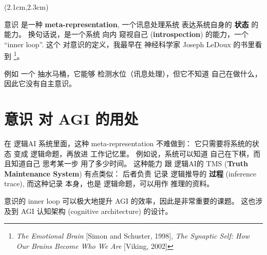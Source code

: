 \begin{preview}

\cc{
\title{\vspace{-1.5cm} \bfseries\color{blue}{\LARGE AGI 的自主意识}}
}{
\title{\vspace{-1.5cm} \bfseries\color{blue}{\LARGE Consciousness in AGI}}
}

\date{\vspace{-2cm}} %

\maketitle

\setcounter{section}{0}

\begin{textblock*}{5cm}(2.1cm,2.3cm) %
{}
\end{textblock*}

\begin{minipage}{\textwidth}
\setlength{\parskip}{0.4\baselineskip}

意识 是一种 \textbf{meta-representation}, 一个讯息处理系统 表达系统自身的 \textbf{状态} 的能力。 换句话说，是一个系统 向内 窥视自己 (\textbf{introspection}) 的能力，一个 ``inner loop''.  这个 对意识的定义，我最早在 神经科学家 Joseph LeDoux 的书里看到 \footnote{\textit{The Emotional Brain} [Simon and Schuster, 1998], \textit{The Synaptic Self: How Our Brains Become Who We Are} [Viking, 2002]}。 

例如 一个 抽水马桶，它能够 检测水位（讯息处理），但它不知道 自己在做什么，因此它没有自主意识。

\section{意识 对 AGI 的用处}

在 逻辑AI 系统里面，这种 meta-representation 不难做到： 它只需要将系统的状态 变成 逻辑命题，再放进 工作记忆里。 例如说，系统可以知道 自己在下棋，而且知道自己 思考某一步 用了多少时间。 这种能力 跟 逻辑AI的 TMS (\textbf{Truth Maintenance System}) 有点类似： 后者负责 记录 逻辑推导的 \textbf{过程} (inference trace), 而这种记录 本身，也是 逻辑命题，可以用作 推理的资料。 

意识的 inner loop 可以极大地提升 AGI 的效率，因此是非常重要的课题。 这也涉及到 AGI 认知架构 (cognitive architecture) 的设计。


\end{minipage}
\end{preview}
